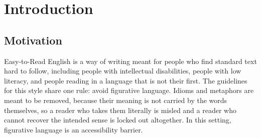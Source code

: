 \section{Introduction}
\label{ch:introduction}

%
%

\subsection{Motivation}

Easy-to-Read English is a way of writing meant for people who find standard
text hard to follow, including people with intellectual disabilities, people
with low literacy, and people reading in a language that is not their first.
The guidelines for this style share one rule: avoid figurative language. Idioms
and metaphors are meant to be removed, because their meaning is not carried by
the words themselves, so a reader who takes them literally is misled and a
reader who cannot recover the intended sense is locked out altogether. In this
setting, figurative language is an accessibility barrier.

